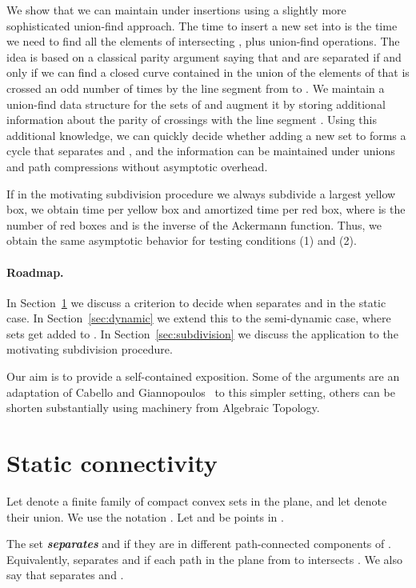 \documentclass[a4paper,11pt]{article}
\def\DEF#1{\textbf{\emph{#1}}}
\begin{document}
We show that we can maintain  under insertions 
using a slightly more sophisticated union-find approach. 
The time to insert a new set  into  is the time
we need to find all the  elements of  intersecting ,
plus  union-find operations.
The idea is based on a classical parity argument saying that 
 and  are separated if and only if we
can find a closed curve contained in the union of the elements of  
that is crossed an odd number of times by the line segment  from  to . 
We maintain a union-find data structure for the sets of  and augment
it by storing additional information about the parity of crossings with the line segment .
Using this additional knowledge, we can quickly decide whether adding a new set
to  forms a cycle that separates  and , 
and the information can be maintained under unions
and path compressions without asymptotic overhead.

If in the motivating subdivision procedure we always subdivide a largest
yellow box, we obtain  time per yellow box and 
 amortized time per red box, where  is the number of red boxes and
 is the inverse of the Ackermann function.
Thus, we obtain the same asymptotic behavior for testing conditions (1) and (2).

\paragraph{Roadmap.}
In Section~\ref{sec:static} we discuss a criterion to decide when 
separates  and  in the static case.
In Section~\ref{sec:dynamic} we extend this to the semi-dynamic case,
where sets get added to .
In Section~\ref{sec:subdivision} we discuss the application to the motivating
subdivision procedure.

Our aim is to provide a self-contained exposition.
Some of the arguments are an adaptation of Cabello and Giannopoulos~\cite{cg-15} 
to this simpler setting,
others can be shorten substantially using machinery from Algebraic Topology.

 
\section{Static connectivity}
\label{sec:static}

Let  denote a finite family of compact convex sets in the plane,
and let  denote their union. 
We use the notation .
Let  and  be points in .

The set  \DEF{separates}
 and  if they are in different path-connected components of .
Equivalently,  separates  and  if 
each path in the plane from  to  intersects .
We also say that  separates  and .
\end{document}
